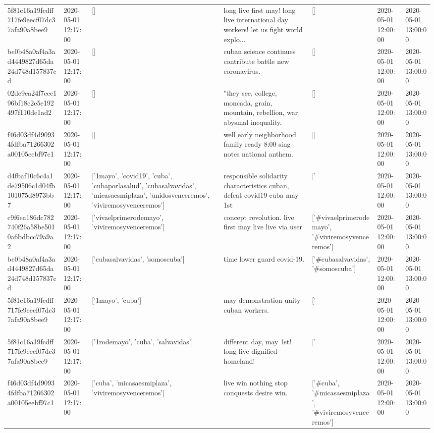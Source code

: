\begin{tabular}{lllllll}
5f81c16a19fcdff717fe9eecf07dc37afa90a8bee9 & 2020-05-01 12:17:00 & [] & long live first may! long live international day workers! let us fight world explo... & [] & 2020-05-01 12:00:00 & 2020-05-01 13:00:00 \\
be0b48a0af4a3ad4449827d65da24d748d157837cd & 2020-05-01 12:17:00 & [] & cuban science continues contribute battle new coronavirus. & [] & 2020-05-01 12:00:00 & 2020-05-01 13:00:00 \\
02de9ea24f7eee196bf18c2e5e192497f110de1ad2 & 2020-05-01 12:17:00 & [] & "they see, college, moncada, grain, mountain, rebellion, war abysmal inequality. & [] & 2020-05-01 12:00:00 & 2020-05-01 13:00:00 \\
f46d03df4d90934fdfba71266302a00105eebf97c1 & 2020-05-01 12:17:00 & [] & well early neighborhood family ready 8:00 sing notes national anthem. & [] & 2020-05-01 12:00:00 & 2020-05-01 13:00:00 \\
d4fbaf10c6c4a1de79506c1d04fb101075d8973bb7 & 2020-05-01 12:17:00 & ['1mayo', 'covid19', 'cuba', 'cubaporlasalud', 'cubasalvavidas', 'micasaesmiplaza', 'unidosvenceremos', 'viviremosyvenceremos'] & responsible solidarity characteristics cuban, defeat covid19 cuba may 1st & ['#1mayo', '#covid19', '#cuba', '#cubaporlasalud', '#cubasalvavidas', '#micasaesmiplaza', '#unidosvenceremos', '#viviremosyvenceremos'] & 2020-05-01 12:00:00 & 2020-05-01 13:00:00 \\
c9f6ea186dc782740f26a58be5010a6bdbcc79a9a2 & 2020-05-01 12:17:00 & ['vivaelprimerodemayo', 'viviremosyvenceremos'] & concept revolution. live first may live live via user & ['#vivaelprimerodemayo', '#viviremosyvenceremos'] & 2020-05-01 12:00:00 & 2020-05-01 13:00:00 \\
be0b48a0af4a3ad4449827d65da24d748d157837cd & 2020-05-01 12:17:00 & ['cubasalvavidas', 'somoscuba'] & time lower guard covid-19. & ['#cubasalvavidas', '#somoscuba'] & 2020-05-01 12:00:00 & 2020-05-01 13:00:00 \\
5f81c16a19fcdff717fe9eecf07dc37afa90a8bee9 & 2020-05-01 12:17:00 & ['1mayo', 'cuba'] & may demonstration unity cuban workers. & ['#1mayo', '#cuba'] & 2020-05-01 12:00:00 & 2020-05-01 13:00:00 \\
5f81c16a19fcdff717fe9eecf07dc37afa90a8bee9 & 2020-05-01 12:17:00 & ['1rodemayo', 'cuba', 'salvavidas'] & different day, may 1st! long live dignified homeland! & ['#1rodemayo', '#cuba', '#salvavidas'] & 2020-05-01 12:00:00 & 2020-05-01 13:00:00 \\
f46d03df4d90934fdfba71266302a00105eebf97c1 & 2020-05-01 12:17:00 & ['cuba', 'micasaesmiplaza', 'viviremosyvenceremos'] & live win nothing stop conquests desire win. & ['#cuba', '#micasaesmiplaza', '#viviremosyvenceremos'] & 2020-05-01 12:00:00 & 2020-05-01 13:00:00 \\

\end{tabular}
